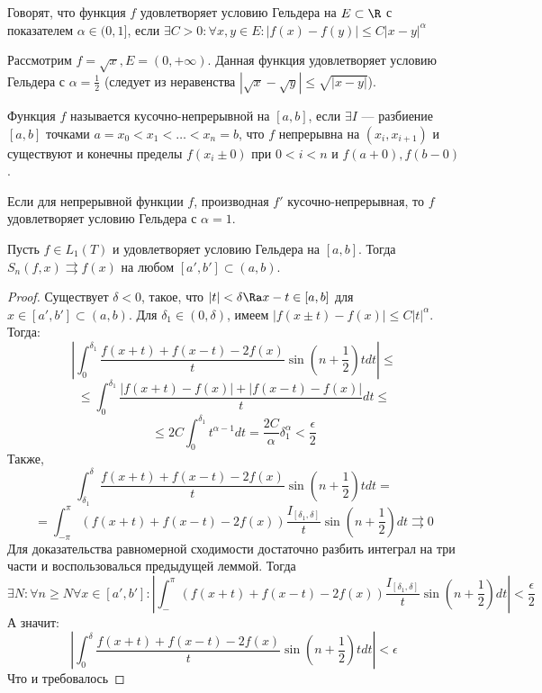 \begin{definition}
    Говорят, что функция \(f\) удовлетворяет условию Гельдера на \(E \subset \R\) с показателем \(\alpha \in (0, 1]\), если \(\exists C > 0: \forall x, y \in E: |f(x) - f(y)| \le C|x - y|^\alpha\)
\end{definition}

\begin{example}
    Рассмотрим \(f = \sqrt{x}, E = (0, +\infty)\). Данная функция удовлетворяет условию Гельдера с \(\alpha = \frac{1}{2}\) (следует из неравенства \(|\sqrt{x} - \sqrt{y}| \le \sqrt{|x - y|}\)).
\end{example}

\begin{definition}
    Функция \(f\) называется кусочно-непрерывной на \([a, b]\), если \(\exists I\) --- разбиение \([a, b]\) точками \(a = x_0 < x_1 < \dots < x_n = b\), что \(f\) непрерывна на \((x_i, x_{i + 1})\) и существуют и конечны пределы \(f(x_i \pm 0)\) при \(0 < i < n\) и \(f(a + 0), f(b - 0)\).
\end{definition}

\begin{example}
    Если для непрерывной функции \(f\), производная \(f'\) кусочно-непрерывная, то \(f\) удовлетворяет условию Гельдера с \(\alpha = 1\).
\end{example}

\begin{theorem}
    Пусть \(f \in L_1(T)\) и удовлетворяет условию Гельдера на \([a, b]\). Тогда \(S_n(f, x) \rightrightarrows f(x)\) на любом \([a', b'] \subset (a, b)\).
\end{theorem}
\begin{proof}
    Существует \(\delta < 0\), такое, что \(|t| < \delta \Ra x - t \in [a, b]\) для \(x \in [a', b'] \subset (a, b)\). Для \(\delta_1 \in (0, \delta)\), имеем \(|f(x \pm t) - f(x)| \le C|t|^\alpha\). Тогда:
    \[\left| \int_0^{\delta_1} \frac{f(x + t) + f(x - t) - 2f(x)}{t}\sin\left( n + \frac{1}{2} \right)tdt \right| \le\]
    \[\le \int_0^{\delta_1} \frac{|f(x + t) - f(x)| + |f(x - t) - f(x)|}{t}dt \le\]
    \[\le 2C\int_0^{\delta_1}t^{\alpha - 1}dt = \frac{2C}{\alpha}\delta_1^\alpha < \frac{\epsilon}{2}\]
    Также, 
    \[\int_{\delta_1}^\delta \frac{f(x + t) + f(x - t) - 2f(x)}{t}\sin\left( n + \frac{1}{2} \right)tdt = \]
    \[=\int_{-\pi}^{\pi} (f(x + t) + f(x - t) - 2f(x))\frac{I_{[\delta_1, \delta]}}{t}\sin\left( n + \frac{1}{2} \right)dt \rightrightarrows 0\]
    Для доказательства равномерной сходимости достаточно разбить интеграл на три части и воспользовалься предыдущей леммой. Тогда
    \[\exists N: \forall n \ge N \forall x \in [a', b']: \left| \int_{-}^{\pi} (f(x + t) + f(x - t) - 2f(x))\frac{I_{[\delta_1, \delta]}}{t}\sin\left( n + \frac{1}{2} \right)dt \right| < \frac{\epsilon}{2}\]
    А значит:
    \[\left| \int_{0}^{\delta} \frac{f(x + t) + f(x - t) - 2f(x)}{t}\sin\left( n + \frac{1}{2} \right)tdt \right|  < \epsilon\]
    Что и требовалось
\end{proof}

